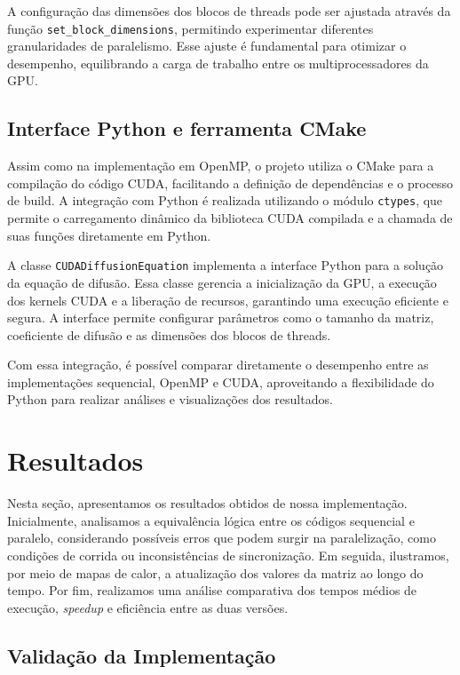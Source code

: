 \documentclass[12pt]{article}
\begin{document}
A configuração das dimensões dos blocos de threads pode ser ajustada através da função \texttt{set\_block\_dimensions}, permitindo experimentar diferentes granularidades de paralelismo. Esse ajuste é fundamental para otimizar o desempenho, equilibrando a carga de trabalho entre os multiprocessadores da GPU.

\subsection{Interface Python e ferramenta CMake}

Assim como na implementação em OpenMP, o projeto utiliza o CMake para a compilação do código CUDA, facilitando a definição de dependências e o processo de build. A integração com Python é realizada utilizando o módulo \texttt{ctypes}, que permite o carregamento dinâmico da biblioteca CUDA compilada e a chamada de suas funções diretamente em Python.

A classe \texttt{CUDADiffusionEquation} implementa a interface Python para a solução da equação de difusão. Essa classe gerencia a inicialização da GPU, a execução dos kernels CUDA e a liberação de recursos, garantindo uma execução eficiente e segura. A interface permite configurar parâmetros como o tamanho da matriz, coeficiente de difusão e as dimensões dos blocos de threads.

Com essa integração, é possível comparar diretamente o desempenho entre as implementações sequencial, OpenMP e CUDA, aproveitando a flexibilidade do Python para realizar análises e visualizações dos resultados.

\section{Resultados}

Nesta seção, apresentamos os resultados obtidos de nossa implementação.
Inicialmente, analisamos a equivalência lógica entre os códigos sequencial e
paralelo, considerando possíveis erros que podem surgir na paralelização, como
condições de corrida ou inconsistências de sincronização. Em seguida,
ilustramos, por meio de mapas de calor, a atualização dos valores da matriz ao
longo do tempo. Por fim, realizamos uma análise comparativa dos tempos médios
de execução, \textit{speedup} e eficiência entre as duas versões.

\subsection{Validação da Implementação}
\end{document}
